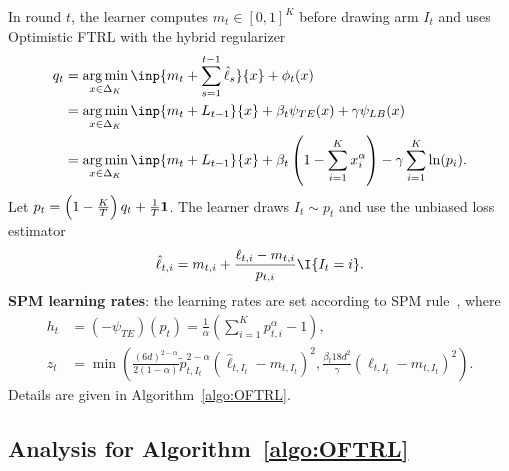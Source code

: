 In round $t$, the learner computes $m_t \in [0,1]^K$ before drawing arm $I_t$ and uses Optimistic FTRL with the hybrid regularizer
\begin{align*}
    q_t &= \argmin_{x \in \Delta_K} \inp{m_t + \sum_{s=1}^{t-1}\hat{\ell}_s}{x} + \phi_t(x) \\
    &= \argmin_{x \in \Delta_K} \inp{m_t + L_{t-1}}{x} + \beta_t\psi_{TE}(x) + \gamma\psi_{LB}(x) \\
    &= \argmin_{x \in \Delta_K} \inp{m_t + L_{t-1}}{x} + \beta_t\left(1 - \sum_{i=1}^K x_i^\alpha\right) - \gamma\sum_{i=1}^K \ln(p_i).
\end{align*}
Let $p_t = \left(1-\frac{K}{T}\right)q_t + \frac{1}{T}\bm{1}$.
The learner draws $I_t \sim p_t$ and use the unbiased loss estimator
\begin{align*}
    \hat{\ell}_{t,i} = m_{t,i} + \frac{\ell_{t,i} - m_{t,i}}{p_{t,i}}\I{I_t = i}.
\end{align*}
%
\textbf{SPM learning rates}: the learning rates are set according to SPM rule~\citep{ItoCOLT2024}, where 
\begin{align*}
    h_t &= (-\psi_{TE})(p_{t}) = \frac{1}{\alpha}\left(\sum_{i=1}^K p_{t,i}^{\alpha}-1\right), \\
    z_t &= \min\left( \frac{(6d)^{2-\alpha}}{2(1-\alpha)}\tilde{p}_{t,I_t}^{2-\alpha}(\hat{\ell}_{t,I_t} - m_{t,I_t})^2, \frac{\beta_t18d^2}{\gamma}(\ell_{t,I_t} - m_{t,I_t})^2  \right).
\end{align*}
Details are given in Algorithm~\ref{algo:OFTRL}.


\subsection{Analysis for Algorithm~\ref{algo:OFTRL}}

